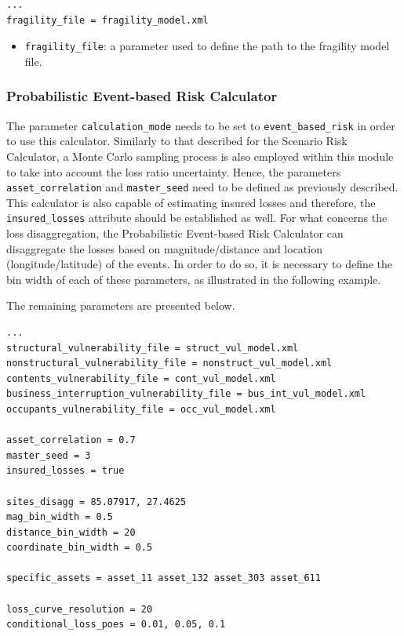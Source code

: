 \begin{Verbatim}[frame=single, commandchars=\\\{\}, samepage=true]
...
fragility_file = fragility_model.xml
\end{Verbatim}

\begin{itemize}
\item  \Verb+fragility_file+: a parameter used to define the path to the \gls{fragility model} file.
\end{itemize}

\subsubsection{Probabilistic Event-based Risk Calculator}
The parameter \Verb+calculation_mode+ needs to be set to \Verb+event_based_risk+ in order to use this calculator. Similarly to that described for the Scenario Risk Calculator, a Monte Carlo sampling process is also employed within this module to take into account the loss ratio uncertainty. Hence, the parameters \Verb+asset_correlation+ and \Verb+master_seed+ need to be defined as previously described. This calculator is also capable of estimating insured losses and therefore, the \Verb+insured_losses+ attribute should be established as well.
For what concerns the loss disaggregation, the Probabilistic Event-based Risk Calculator can disaggregate the losses based on magnitude/distance and location (longitude/latitude) of the events. In order to do so, it is necessary to define the bin width of each of these parameters, as illustrated in the following example.

 The remaining parameters are presented below.

\begin{Verbatim}[frame=single, commandchars=\\\{\}, samepage=true]
...
structural_vulnerability_file = struct_vul_model.xml
nonstructural_vulnerability_file = nonstruct_vul_model.xml
contents_vulnerability_file = cont_vul_model.xml
business_interruption_vulnerability_file = bus_int_vul_model.xml
occupants_vulnerability_file = occ_vul_model.xml

asset_correlation = 0.7
master_seed = 3
insured_losses = true

sites_disagg = 85.07917, 27.4625
mag_bin_width = 0.5
distance_bin_width = 20
coordinate_bin_width = 0.5

specific_assets = asset_11 asset_132 asset_303 asset_611

loss_curve_resolution = 20
conditional_loss_poes = 0.01, 0.05, 0.1
\end{Verbatim}

